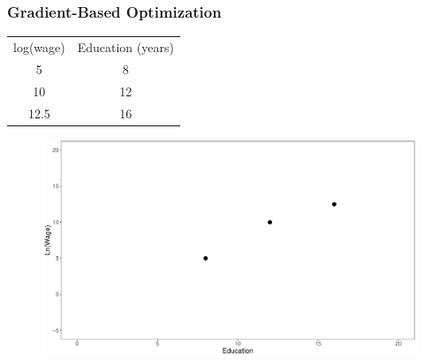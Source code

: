 \documentclass[
  shownotes,
  xcolor={svgnames},
  hyperref={colorlinks,citecolor=DarkBlue,linkcolor=DarkRed,urlcolor=DarkBlue}
  , aspectratio=169]{beamer}
\begin{document}
\begin{frame}[fragile]
\frametitle{Gradient-Based Optimization}





\begin{minipage}[c]{0.38\linewidth}
        
\begin{table}[]
\begin{tabular}{cc}
log(wage) & Education (years) \\
5         & 8                                                         \\
10        & 12                                                          \\
12.5      & 16                                                          \\
\end{tabular}
\end{table}
           
    \end{minipage}
    \hfill
    \begin{minipage}[t]{0.58\linewidth}%
        \begin{figure}[H] \centering
            \captionsetup{justification=centering}  
            \includegraphics[scale=0.25]{figures/fig_1.pdf}
    \end{figure}
    \end{minipage}

\end{frame}
\end{document}

